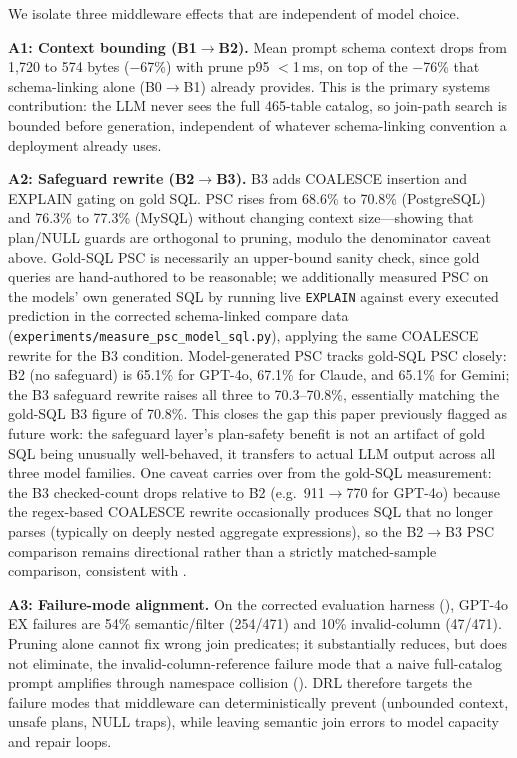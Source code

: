 \documentclass[twocolumn]{svjour3}
\begin{document}
We isolate three middleware effects that are independent of model choice.

\textbf{A1: Context bounding (B1$\rightarrow$B2).}
Mean prompt schema context drops from 1{,}720 to 574 bytes ($-$67\%) with prune p95 $<$1\,ms, on top of the $-$76\% that schema-linking alone (B0$\to$B1) already provides.
This is the primary systems contribution: the LLM never sees the full 465-table catalog, so join-path search is bounded before generation, independent of whatever schema-linking convention a deployment already uses.

\textbf{A2: Safeguard rewrite (B2$\rightarrow$B3).}
B3 adds COALESCE insertion and EXPLAIN gating on gold SQL.
PSC rises from 68.6\% to 70.8\% (PostgreSQL) and 76.3\% to 77.3\% (MySQL) without changing context size---showing that plan/NULL guards are orthogonal to pruning, modulo the denominator caveat above.
Gold-SQL PSC is necessarily an upper-bound sanity check, since gold queries are hand-authored to be reasonable; we additionally measured PSC on the models' own generated SQL by running live \texttt{EXPLAIN} against every executed prediction in the corrected schema-linked compare data (\texttt{experiments/measure\_psc\_model\_sql.py}), applying the same COALESCE rewrite for the B3 condition.
Model-generated PSC tracks gold-SQL PSC closely: B2 (no safeguard) is 65.1\% for GPT-4o, 67.1\% for Claude, and 65.1\% for Gemini; the B3 safeguard rewrite raises all three to 70.3--70.8\%, essentially matching the gold-SQL B3 figure of 70.8\%.
This closes the gap this paper previously flagged as future work: the safeguard layer's plan-safety benefit is not an artifact of gold SQL being unusually well-behaved, it transfers to actual LLM output across all three model families.
One caveat carries over from the gold-SQL measurement: the B3 checked-count drops relative to B2 (e.g.\ 911$\to$770 for GPT-4o) because the regex-based COALESCE rewrite occasionally produces SQL that no longer parses (typically on deeply nested aggregate expressions), so the B2$\to$B3 PSC comparison remains directional rather than a strictly matched-sample comparison, consistent with .

\textbf{A3: Failure-mode alignment.}
On the corrected evaluation harness (), GPT-4o EX failures are 54\% semantic/filter (254/471) and 10\% invalid-column (47/471).
Pruning alone cannot fix wrong join predicates; it substantially reduces, but does not eliminate, the invalid-column-reference failure mode that a naive full-catalog prompt amplifies through namespace collision ().
DRL therefore targets the failure modes that middleware can deterministically prevent (unbounded context, unsafe plans, NULL traps), while leaving semantic join errors to model capacity and repair loops.
\end{document}
